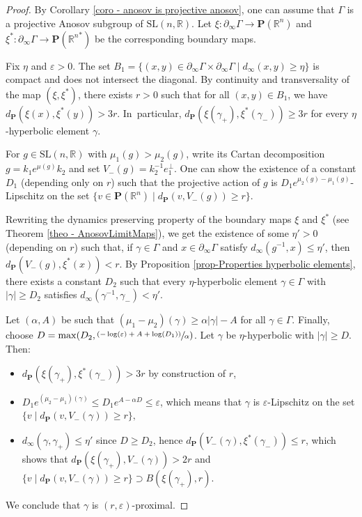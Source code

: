 \documentclass[JEP,XML,SOM,Unicode,NoEqCountersInSection,NoFloatCountersInSection,published]{cedram}
\newcommand{\psfrac}[2]{\sfrac{(#1)}{#2}}
\theoremstyle{definition}
\newcommand{\proj}{\mathbf{P}}
\newcommand{\R}{\mathbb{R}}
\newcommand{\SL}{\mathrm{SL}}
\let\epsilon\varepsilon
\let\G\Gamma
\let\g\gamma
\begin{document}
\begin{proof}
By Corollary \ref{coro - anosov is projective anosov}, one can assume that $\Gamma$ is a projective Anosov subgroup of $\SL(n,\R)$. Let $\xi:\partial_\infty \Gamma \to \proj(\R^n)$ and $\xi^*: \partial_\infty \Gamma \to \proj({\R^n}^*)$ be the corresponding boundary maps.

Fix $\eta$ and $\epsilon>0$. The set $ B_1 =\{(x,y)\in \partial_\infty \Gamma \times \partial_\infty \Gamma \mid d_\infty(x,y) \geq \eta\}$ is compact and does not intersect the diagonal. By continuity and transversality of the map $(\xi,\xi^*)$, there exists $r>0$ such that for all $(x,y)\in B_1$, we have $d_\proj(\xi(x), \xi^*(y))> 3r$. In~particular, $d_\proj(\xi(\g_+), \xi^*(\g_-)) \geq 3r$ for every $\eta$-hyperbolic element $\g$.

For $g\in \SL(n,\R)$ with $\mu_1(g) > \mu_2(g)$, write its Cartan decomposition $g= k_1 e^{\mu(g)} k_2$ and set $V_-(g) = k_2^{-1}e_1^\perp$. One can show the existence of a constant $D_1$ (depending only on $r$) such that the projective action of $g$ is $D_1 e^{\mu_2(g)-\mu_1(g)}$-Lipschitz on the set $\{v \in \proj(\R^n) \mid d_\proj(v, V_-(g)) \geq r\}$.

Rewriting the dynamics preserving property of the boundary maps $\xi$ and $\xi^*$ (see Theorem \ref{theo - AnosovLimitMaps}), we get the existence of some $\eta'>0$ (depending on $r$) such that, if $\g \in \G$ and $x\in \partial_\infty \G$ satisfy $d_\infty (g^{-1},x)\leq \eta'$, then $d_\proj(V_-(g), \xi^*(x)) < r$. By Proposition \ref{prop-Properties hyperbolic elements}, there exists a constant $D_2$ such that every $\eta$-hyperbolic element $\gamma \in \Gamma$ with $\vert \gamma \vert \geq D_2$ satisfies $d_\infty(\gamma^{-1},\gamma_-) <\eta'$.

Let $(\alpha, A)$ be such that $(\mu_1-\mu_2)(\g)\geq \alpha \vert \g \vert -A$ for all $\g\in\G$. Finally, choose $D = \max(D_2,\psfrac{-\log(\epsilon)+A+\log(D_1)}{\alpha})$. Let $\gamma$ be $\eta$-hyperbolic with $\vert \gamma \vert \geq D$. Then:
\begin{itemize}
\item $d_\proj(\xi(\gamma_+),\xi^*(\gamma_-)) > 3r$ by construction of $r$,

\item $D_1 e^{(\mu_2-\mu_1)(\gamma)} \leq D_1 e^{A-\alpha D}\leq \epsilon$, which means that $\gamma$ is $\epsilon$-Lipschitz on the set $\{v\mid d_\proj (v, V_-(\gamma))\geq r\},$
\item $d_\infty(\gamma, \gamma_+) \leq \eta'$ since $D\geq D_2$, hence $d_\proj(V_-(\gamma), \xi^*(\gamma_-)) \leq r$, which shows that $d_\proj(\xi(\gamma_+), V_-(\gamma))>2r$ and $\{v\mid d_\proj(v, V_-(\g))\geq r\} \supset B(\xi(\gamma_+),r)$.
\end{itemize}
We conclude that $\gamma$ is $(r,\epsilon)$-proximal.


\end{proof}
\end{document}
